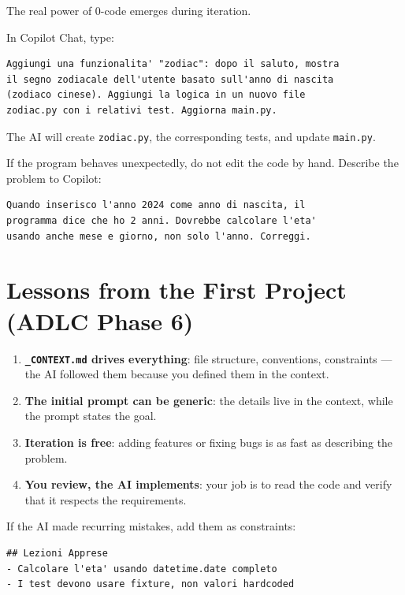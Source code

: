 The real power of 0-code emerges during iteration.

\begin{praticabox}[title={Hands-on --- Adding a feature}]
In Copilot Chat, type:
\begin{lstlisting}[language={}]
Aggiungi una funzionalita' "zodiac": dopo il saluto, mostra
il segno zodiacale dell'utente basato sull'anno di nascita
(zodiaco cinese). Aggiungi la logica in un nuovo file
zodiac.py con i relativi test. Aggiorna main.py.
\end{lstlisting}
The AI will create \texttt{zodiac.py}, the corresponding tests, and update \texttt{main.py}.
\end{praticabox}

\begin{praticabox}[title={Hands-on --- Fixing a bug}]
If the program behaves unexpectedly, do not edit the code by hand. Describe the problem to Copilot:
\begin{lstlisting}[language={}]
Quando inserisco l'anno 2024 come anno di nascita, il
programma dice che ho 2 anni. Dovrebbe calcolare l'eta'
usando anche mese e giorno, non solo l'anno. Correggi.
\end{lstlisting}
\end{praticabox}

\section{Lessons from the First Project (ADLC Phase 6)}

\begin{enumerate}
  \item \textbf{\texttt{\_CONTEXT.md} drives everything}: file structure, conventions, constraints --- the AI followed them because you defined them in the context.
  \item \textbf{The initial prompt can be generic}: the details live in the context, while the prompt states the goal.
  \item \textbf{Iteration is free}: adding features or fixing bugs is as fast as describing the problem.
  \item \textbf{You review, the AI implements}: your job is to read the code and verify that it respects the requirements.
\end{enumerate}

\begin{praticabox}[title={Hands-on --- Update the context}]
If the AI made recurring mistakes, add them as constraints:
\begin{lstlisting}[language={}]
## Lezioni Apprese
- Calcolare l'eta' usando datetime.date completo
- I test devono usare fixture, non valori hardcoded
\end{lstlisting}
\end{praticabox}

